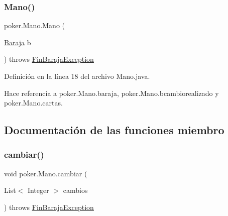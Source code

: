 \subsubsection{\texorpdfstring{Mano()}{Mano()}}
{\footnotesize\ttfamily poker.\+Mano.\+Mano (\begin{DoxyParamCaption}\item[{\mbox{\hyperlink{classpoker_1_1Baraja}{Baraja}}}]{b }\end{DoxyParamCaption}) throws \mbox{\hyperlink{classpoker_1_1FinBarajaException}{Fin\+Baraja\+Exception}}}



Definición en la línea 18 del archivo Mano.\+java.


\begin{DoxyCode}{0}

\end{DoxyCode}


Hace referencia a poker.\+Mano.\+baraja, poker.\+Mano.\+bcambiorealizado y poker.\+Mano.\+cartas.



\subsection{Documentación de las funciones miembro}
\mbox{\label{classpoker_1_1Mano_a1f3e7289b85d98324d46a8afce171368}} 
\subsubsection{\texorpdfstring{cambiar()}{cambiar()}}
{\footnotesize\ttfamily void poker.\+Mano.\+cambiar (\begin{DoxyParamCaption}\item[{List$<$ Integer $>$}]{cambios }\end{DoxyParamCaption}) throws \mbox{\hyperlink{classpoker_1_1FinBarajaException}{Fin\+Baraja\+Exception}}}



